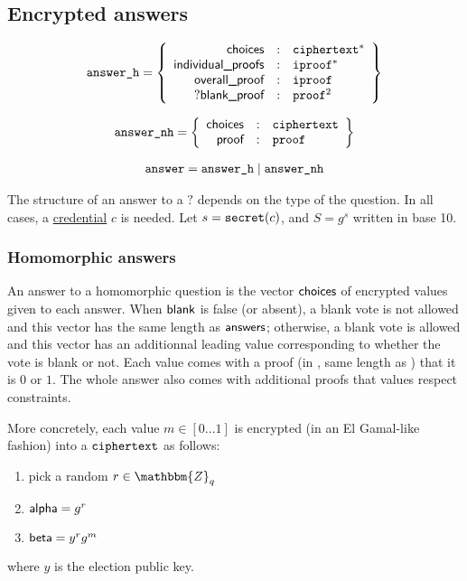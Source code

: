 \documentclass[a4paper]{article}
\newcommand{\Z}{\mathbbm{Z}}
\begin{document}
\subsection{Encrypted answers}
\label{answers}

\begin{gather*}
  \texttt{answer\_h}=\left\{
    \begin{array}{rcl}
      \textsf{choices}&:&\texttt{ciphertext}^\ast\\
      \textsf{individual\_proofs}&:&\texttt{iproof}^\ast\\
      \textsf{overall\_proof}&:&\texttt{iproof}\\
      ?\textsf{blank\_proof}&:&\texttt{proof}^2
    \end{array}
  \right\}
\end{gather*}

\begin{gather*}
  \texttt{answer\_nh}=\left\{
    \begin{array}{rcl}
      \textsf{choices}&:&\texttt{ciphertext}\\
      \textsf{proof}&:&\texttt{proof}
    \end{array}
  \right\}
\end{gather*}

\begin{gather*}
  \texttt{answer}=\texttt{answer\_h}\mid\texttt{answer\_nh}
\end{gather*}

The structure of an answer to a \hyperref[elections]{$\question$}
depends on the type of the question. In all cases, a
\hyperref[credentials]{credential} $c$ is needed. Let $s=\texttt{secret}(c)$,
and $S=g^s$ written in base 10.

\subsubsection{Homomorphic answers}

An answer to a homomorphic question is the vector
$\textsf{choices}$ of encrypted values given to each answer. When $\textsf{blank}$ is
false (or absent), a blank vote is not allowed and this vector has the
same length as $\textsf{answers}$; otherwise, a blank vote is allowed and this
vector has an additionnal leading value corresponding to whether the
vote is blank or not.  Each value comes with a proof (in \iproofs,
same length as \choices) that it is $0$ or $1$. The whole answer also
comes with additional proofs that values respect constraints.

More concretely, each value $m\in[0\dots1]$ is encrypted (in an El
Gamal-like fashion) into a $\texttt{ciphertext}$ as follows:
\begin{enumerate}
\item pick a random $r\in\Z_q$
\item $\textsf{alpha}=g^r$
\item $\textsf{beta}=y^rg^m$
\end{enumerate}
where $y$ is the election public key.
\end{document}
